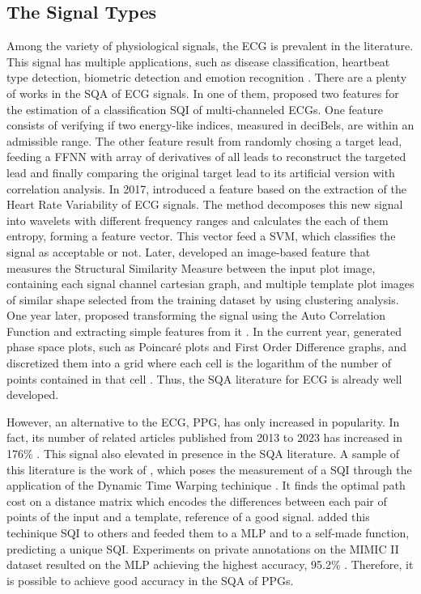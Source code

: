\subsection{The Signal Types}

Among the variety of physiological signals, the \acrfull{ECG} is prevalent in the literature. This signal has multiple applications, such as disease classification, heartbeat type detection, biometric detection and emotion recognition \cite{ecg-1}. There are a plenty of works in the \acrshort{SQA} of ECG signals. In one of them, \citeauthor{ecg-2} proposed two features for the estimation of a classification \acrshort{SQI} of multi-channeled \acrshort{ECG}s. One feature consists of verifying if two energy-like indices, measured in deciBels, are within an admissible range. The other feature result from randomly chosing a target lead, feeding a \acrshort{FFNN} with array of derivatives of all leads to reconstruct the targeted lead and finally comparing the original target lead to its artificial version with correlation analysis. In 2017, \citeauthor{ecg-3} introduced a feature based on the extraction of the Heart Rate Variability of \acrshort{ECG} signals. The method decomposes this new signal into wavelets with different frequency ranges and calculates the each of them entropy, forming a feature vector. This vector feed a \acrshort{SVM}, which classifies the signal as acceptable or not. Later, \citeauthor{ecg-4} developed an image-based feature that measures the Structural Similarity Measure between the input plot image, containing each signal channel cartesian graph, and multiple template plot images of similar shape selected from the training dataset by using clustering analysis. One year later, \citeauthor{ecg-5} proposed transforming the signal using the Auto Correlation Function and extracting simple features from it \cite{ecg-5}. In the current year, \citeauthor{ecg-6} generated phase space plots, such as Poincaré plots and First Order Difference graphs, and discretized them into a grid where each cell is the logarithm of the number of points contained in that cell \cite{ecg-6}. Thus, the \acrshort{SQA} literature for \acrshort{ECG} is already well developed.

However, an alternative to the \acrshort{ECG}, \acrfull{PPG}, has only increased in popularity. In fact, its number of related articles published from 2013 to 2023 has increased in 176\% \cite{ppg-1}. This signal also elevated in presence in the \acrshort{SQA} literature. A sample of this literature is the work of \citeauthor{review-1}, which poses the measurement of a \acrshort{SQI} through the application of the Dynamic Time Warping techinique \cite{review-1}. It finds the optimal path cost on a distance matrix which encodes the differences between each pair of points of the input and a template, reference of a good signal. \citeauthor{review-1} added this techinique \acrshort{SQI} to others and feeded them to a \acrshort{MLP} and to a self-made function, predicting a unique \acrshort{SQI}. Experiments on private annotations on the MIMIC II dataset resulted on the \acrshort{MLP} achieving the highest accuracy, 95.2\% \cite{review-1}. Therefore, it is possible to achieve good accuracy in the \acrshort{SQA} of \acrshort{PPG}s.      
	
